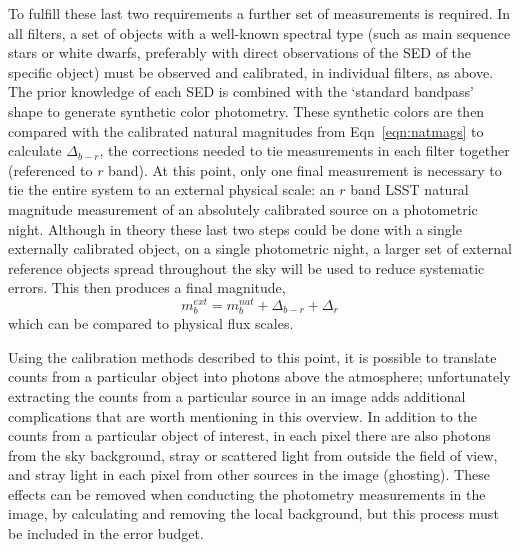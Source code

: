 \documentclass[12pt,preprint]{aastex}
\begin{document}
To fulfill these last two requirements a further set of measurements
is required. In all filters, a set of objects with a well-known
spectral type (such as main sequence stars or white dwarfs, preferably
with direct observations of the SED of the specific object) must be
observed and calibrated, in individual filters, as above. The prior
knowledge of each SED is combined with the `standard bandpass' shape
to generate synthetic color photometry. These synthetic colors are
then compared with the calibrated natural magnitudes from
Eqn~\ref{eqn:natmags} to calculate $\Delta_{b-r}$, the corrections
needed to tie measurements in each filter together (referenced to $r$
band).  At this point, only one final measurement is necessary to tie
the entire system to an external physical scale: an $r$ band LSST
natural magnitude measurement of an absolutely calibrated source on a
photometric night. Although in theory these last two steps could be
done with a single externally calibrated object, on a single
photometric night, a larger set of external reference objects spread
throughout the sky will be used to reduce systematic errors. This then
produces a final magnitude, 
\begin{equation}
\label{eqn:finalmags}
m_b^{ext} = m_b^{nat}  + \Delta_{b-r} + \Delta_r
\end{equation}
which can be compared to physical flux scales. 

Using the calibration methods described to this point, it is possible
to translate counts from a particular object into photons above the
atmosphere; unfortunately extracting the counts from a particular
source in an image adds additional complications that are worth
mentioning in this overview. In addition to the counts from a
particular object of interest, in each pixel there are also photons
from the sky background, stray or scattered light from outside the
field of view, and stray light in each pixel from other sources
in the image (ghosting). These effects can be removed when conducting
the photometry measurements in the image, by calculating and removing
the local background, but this process must be included in the error
budget.
\end{document}
